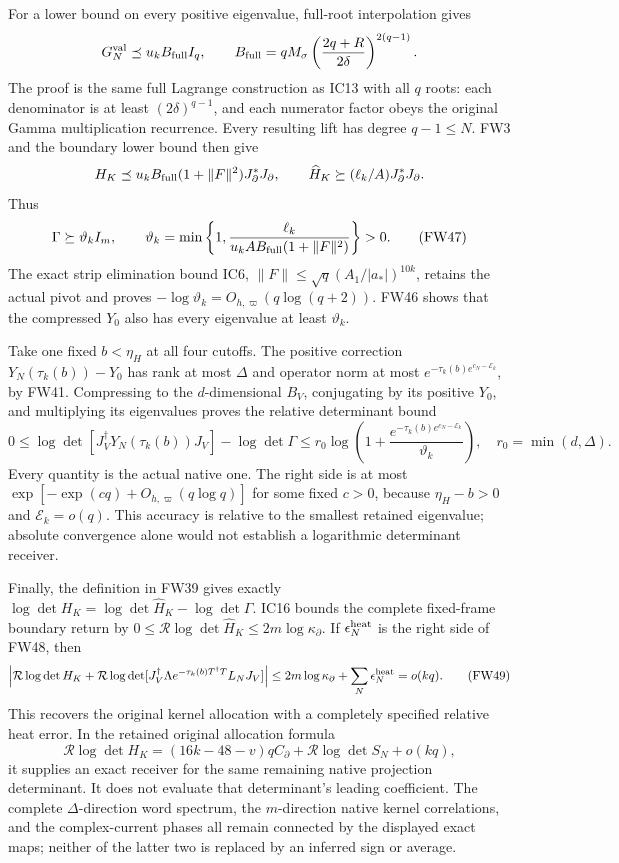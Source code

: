 \documentclass[11pt]{article}
\begin{document}
For a lower bound on every positive eigenvalue, full-root interpolation gives \[
G_N^{\rm val}\preceq u_kB_{\rm full}I_q,\qquad
B_{\rm full}=qM_\sigma\left(\frac{2q+R}{2\delta}\right)^{2(q-1)}.
\] The proof is the same full Lagrange construction as IC13 with all \(q\) roots: each denominator is at least \((2\delta)^{q-1}\), and each numerator factor obeys the original Gamma multiplication recurrence. Every resulting lift has degree \(q-1\le N\). FW3 and the boundary lower bound then give \[
H_K\preceq u_kB_{\rm full}(1+\|F\|^2)J_\partial^*J_\partial,\qquad
\widehat H_K\succeq(\ell_k/A)J_\partial^*J_\partial.
\] Thus \[
\Gamma\succeq\vartheta_kI_m,\qquad
\vartheta_k=\min\left\{1,\frac{\ell_k}{u_kAB_{\rm full}(1+\|F\|^2)}\right\}>0.
\tag{FW47}
\] The exact strip elimination bound IC6, \(\|F\|\le\sqrt q(A_1/|a_*|)^{10k}\), retains the actual pivot and proves \(-\log\vartheta_k=O_{h,\varpi}(q\log(q+2))\). FW46 shows that the compressed \(Y_0\) also has every eigenvalue at least \(\vartheta_k\).

Take one fixed \(b<\eta_H\) at all four cutoffs. The positive correction \(Y_N(\tau_k(b))-Y_0\) has rank at most \(\Delta\) and operator norm at most \(e^{-\tau_k(b)e^{c_N-\mathcal E_k}}\), by FW41. Compressing to the \(d\)-dimensional \(B_V\), conjugating by its positive \(Y_0\), and multiplying its eigenvalues proves the relative determinant bound \[
0\le\log\det[J_V^\dagger Y_N(\tau_k(b))J_V]-\log\det\Gamma
\le r_0\log\left(1+\frac{e^{-\tau_k(b)e^{c_N-\mathcal E_k}}}{\vartheta_k}\right),
\quad r_0=\min(d,\Delta).
\tag{FW48}
\] Every quantity is the actual native one. The right side is at most \(\exp[-\exp(cq)+O_{h,\varpi}(q\log q)]\) for some fixed \(c>0\), because \(\eta_H-b>0\) and \(\mathcal E_k=o(q)\). This accuracy is relative to the smallest retained eigenvalue; absolute convergence alone would not establish a logarithmic determinant receiver.

Finally, the definition in FW39 gives exactly \(\log\det H_K=\log\det\widehat H_K-\log\det\Gamma\). IC16 bounds the complete fixed-frame boundary return by \(0\le\mathcal R\log\det\widehat H_K\le2m\log\kappa_\partial\). If \(\epsilon_N^{\rm heat}\) is the right side of FW48, then \[
\left|\mathcal R\log\det H_K+
\mathcal R\log\det[J_V^\dagger\Lambda e^{-\tau_k(b)T^{\dagger}T}L_NJ_V]\right|
\le2m\log\kappa_\partial+\sum_N\epsilon_N^{\rm heat}=o(kq).
\tag{FW49}
\] This recovers the original kernel allocation with a completely specified relative heat error. In the retained original allocation formula \[
\mathcal R\log\det H_K=(16k-48-v)qC_\partial+\mathcal R\log\det S_N+o(kq),
\] it supplies an exact receiver for the same remaining native projection determinant. It does not evaluate that determinant's leading coefficient. The complete \(\Delta\)-direction word spectrum, the \(m\)-direction native kernel correlations, and the complex-current phases all remain connected by the displayed exact maps; neither of the latter two is replaced by an inferred sign or average.
\end{document}
